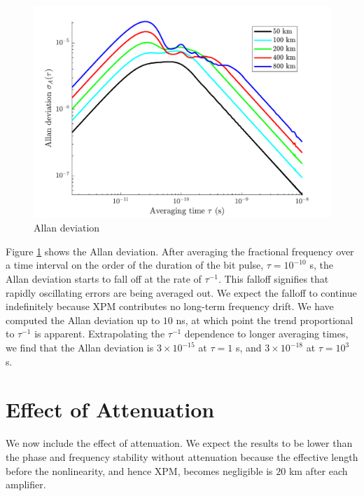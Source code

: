 %
\begin{figure}[htb]
	\centering
	\includegraphics[scale=0.9]{img/NAAllanDev}
	\caption{Allan deviation} \label{fig:NAAllanDev}
\end{figure}
%
Figure \ref{fig:NAAllanDev} shows the Allan deviation. After averaging the fractional frequency over a time interval on the order of the duration of the bit pulse, $\tau = 10^{-10}$ s, the Allan deviation starts to fall off at the rate of $\tau^{-1}$. This falloff signifies that rapidly oscillating errors are being averaged out. We expect the falloff to continue indefinitely because XPM contributes no long-term frequency drift. We have computed the Allan deviation up to $10$ ns, at which point the trend proportional to $\tau^{-1}$ is apparent. Extrapolating the $\tau^{-1}$ dependence to longer averaging times, we find that the Allan deviation is $3\times 10^{-15}$ at $\tau = 1$ s, and $3\times 10^{-18}$ at $\tau=10^3$ s.

\section{Effect of Attenuation}

We now include the effect of attenuation. We expect the results to be lower than the phase and frequency stability without attenuation because the effective length before the nonlinearity, and hence XPM, becomes negligible is $20$ km after each amplifier.

